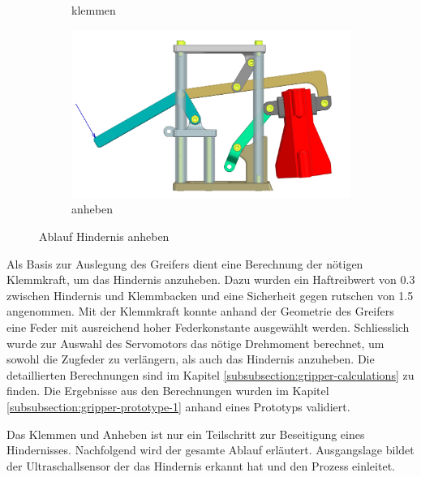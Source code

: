 \begin{figure}[H]
\begin{subfigure}{0.49\textwidth}
\caption{klemmen}
\label{fig:gripper_gripping_side}
\end{subfigure}
\begin{subfigure}{0.49\textwidth}
\centering
\includegraphics[width=\textwidth]{assets/greifer-prototyp/Greifer_side_Angehoben.png}
\caption{anheben}
\label{fig:gripper_lifting_side}
\end{subfigure}
\caption{Ablauf Hindernis anheben}
\label{fig:obstacle_gripping_process}
\end{figure}

 \newpage
 
Als Basis zur Auslegung des Greifers dient eine Berechnung der nötigen Klemmkraft, um das Hindernis anzuheben. Dazu wurden ein Haftreibwert von 0.3 zwischen Hindernis und Klemmbacken und eine Sicherheit gegen rutschen von 1.5 angenommen. Mit der Klemmkraft konnte anhand der Geometrie des Greifers eine Feder mit ausreichend hoher Federkonstante ausgewählt werden. Schliesslich wurde zur Auswahl des Servomotors das nötige Drehmoment berechnet, um sowohl die Zugfeder zu verlängern, als auch das Hindernis anzuheben. Die detaillierten Berechnungen sind im Kapitel \ref{subsubsection:gripper-calculations} zu finden. Die Ergebnisse aus den Berechnungen wurden im Kapitel \ref{subsubsection:gripper-prototype-1} anhand eines Prototyps validiert.

Das Klemmen und Anheben ist nur ein Teilschritt  zur Beseitigung eines Hindernisses. Nachfolgend wird der gesamte Ablauf erläutert. Ausgangslage bildet der Ultraschallsensor der das Hindernis erkannt hat und den Prozess einleitet. 

